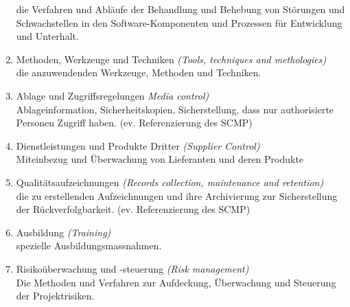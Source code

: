 \begin{enumerate}
 die Verfahren und Abläufe der Behandlung und Behebung von Störungen und
 Schwachstellen in den Software-Komponenten und Prozessen für Entwicklung und
 Unterhalt.
\item Methoden, Werkzeuge und Techniken {\em (Tools, techniques and
    methologies)}\\
   die anzuwendenden Werkzeuge, Methoden und Techniken.
 \item Ablage und Zugriffsregelungen {\em Media control)}\\
  Ablageinformation, Sicherheitskopien, Sicherstellung, dass nur authorisierte
  Personen Zugriff haben. (ev. Referenzierung des SCMP)
\item Dienstleistungen und Produkte Dritter {\em (Supplier Control)}\\
  Miteinbezug und Überwachung von Lieferanten und deren Produkte
\item Qualitätsaufzeichnungen {\em (Records collection, maintenance
    and retention)}\\
  die zu erstellenden Aufzeichnungen und ihre Archivierung zur
     Sicherstellung der Rück\-ver\-folg\-barkeit. (ev. Referenzierung des SCMP)
\item Ausbildung {\em (Training)}\\
   spezielle Ausbildungsmassnahmen.
\item Risikoüberwachung und -steuerung {\em (Risk management)}\\
  Die Methoden und Verfahren zur Aufdeckung, Überwachung und Steuerung der
  Projektrisiken.
\end{enumerate}
%
%
